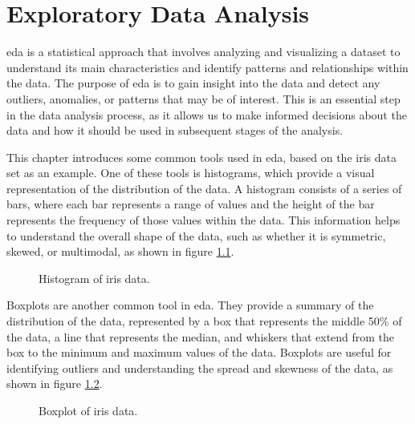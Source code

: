 \chapter{Exploratory Data Analysis}
\label{sec:eda}

\ac{eda} is a statistical approach that involves analyzing and visualizing a dataset to understand its main characteristics and identify patterns and relationships within the data. The purpose of \ac{eda} is to gain insight into the data and detect any outliers, anomalies, or patterns that may be of interest. This is an essential step in the data analysis process, as it allows us to make informed decisions about the data and how it should be used in subsequent stages of the analysis.

This chapter introduces some common tools used in \ac{eda}, based on the iris data set as an example. One of these tools is histograms, which provide a visual representation of the distribution of the data. A histogram consists of a series of bars, where each bar represents a range of values and the height of the bar represents the frequency of those values within the data. This information helps to understand the overall shape of the data, such as whether it is symmetric, skewed, or multimodal, as shown in figure \ref{fig:histogram}.

\begin{figure}
  \begin{center}
    \resizebox{0.8\textwidth}{!}{}
  \end{center}
  \caption{Histogram of iris data.}
  \label{fig:histogram}
\end{figure}

Boxplots are another common tool in \ac{eda}. They provide a summary of the distribution of the data, represented by a box that represents the middle 50\% of the data, a line that represents the median, and whiskers that extend from the box to the minimum and maximum values of the data. Boxplots are useful for identifying outliers and understanding the spread and skewness of the data, as shown in figure \ref{fig:boxplot}.

\begin{figure}
  \begin{center}
    \resizebox{0.8\textwidth}{!}{}
  \end{center}
  \caption{Boxplot of iris data.}
  \label{fig:boxplot}
\end{figure}

